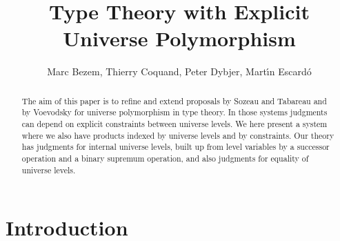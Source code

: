\documentclass[11pt,a4paper]{article}
\theoremstyle{definition}
\begin{document}
\title{Type Theory with Explicit Universe Polymorphism}

\author{Marc Bezem, Thierry Coquand, Peter Dybjer, Mart\'{\i}n Escard\'o}
\date{}
\maketitle

\begin{abstract}

The aim of this paper is to refine and extend proposals by Sozeau and Tabareau and by Voevodsky for universe polymorphism in type theory. In those systems judgments can depend on explicit constraints between universe levels. We here present a system where we also have products indexed by universe levels and by constraints. Our theory has judgments for internal universe levels, built up from level variables by a successor operation and a binary supremum operation, and also judgments for equality of universe levels.


\end{abstract}


\section{Introduction}\label{sec:intro}
\end{document}
